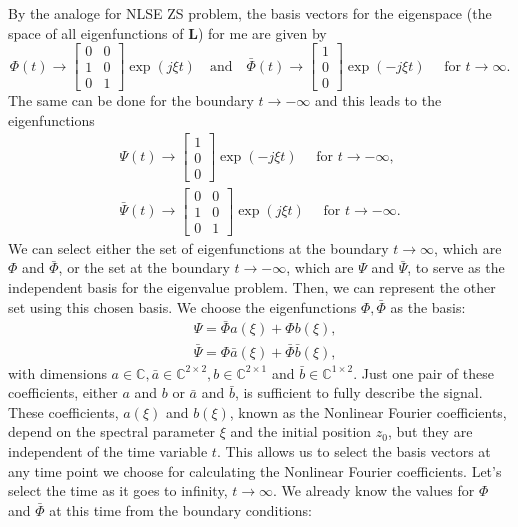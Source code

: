 By the analoge for NLSE ZS problem, the basis vectors for the eigenspace (the space of all eigenfunctions of $\mathbf{L}$) for \acrshort{me} are given by
$$
\Phi(t) \rightarrow\left[\begin{array}{ll}
0 & 0 \\
1 & 0 \\
0 & 1
\end{array}\right] \exp (j \xi t) \quad \text{and} \quad \bar{\Phi}(t) \rightarrow\left[\begin{array}{l}
1 \\
0 \\
0
\end{array}\right] \exp (-j \xi t) \quad \text { for } t \rightarrow \infty .
$$
The same can be done for the boundary $t \rightarrow-\infty$ and this leads to the eigenfunctions
$$
\begin{gathered}
\Psi(t) \rightarrow\left[\begin{array}{l}
1 \\
0 \\
0
\end{array}\right] \exp (-j \xi t) \quad \text { for } t \rightarrow-\infty, \\
\bar{\Psi}(t) \rightarrow\left[\begin{array}{ll}
0 & 0 \\
1 & 0 \\
0 & 1
\end{array}\right] \exp (j \xi t) \quad \text { for } t \rightarrow-\infty .
\end{gathered}
$$
We can select either the set of eigenfunctions at the boundary \( t \rightarrow \infty \), which are \( \Phi \) and \( \bar{\Phi} \), or the set at the boundary \( t \rightarrow -\infty \), which are \( \Psi \) and \( \bar{\Psi} \), to serve as the independent basis for the eigenvalue problem. Then, we can represent the other set using this chosen basis. We choose the eigenfunctions $\Phi, \bar{\Phi}$ as the basis:
\begin{equation}
\begin{aligned}
\label{CommonSolution}
& \Psi=\bar{\Phi} a(\xi)+\Phi b(\xi), \\
& \bar{\Psi}=\Phi \bar{a}(\xi)+\bar{\Phi} \bar{b}(\xi),
\end{aligned}
\end{equation}
with dimensions $a \in \mathbb{C}, \bar{a} \in \mathbb{C}^{2 \times 2}, b \in \mathbb{C}^{2 \times 1}$ and $\bar{b} \in \mathbb{C}^{1 \times 2}$. Just one pair of these coefficients, either \(a\) and \(b\) or \(\bar{a}\) and \(\bar{b}\), is sufficient to fully describe the signal. These coefficients, \(a(\xi)\) and \(b(\xi)\), known as the Nonlinear Fourier coefficients, depend on the spectral parameter \(\xi\) and the initial position \(z_0\), but they are independent of the time variable \(t\). This allows us to select the basis vectors at any time point we choose for calculating the Nonlinear Fourier coefficients. Let's select the time as it goes to infinity, \(t \rightarrow \infty\). We already know the values for \(\Phi\) and \(\bar{\Phi}\) at this time from the boundary conditions:
